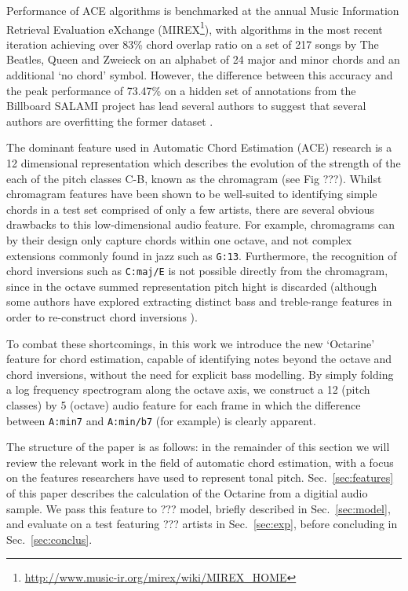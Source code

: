 \documentclass{article}
\begin{document}
Performance of ACE algorithms is benchmarked at the annual Music Information Retrieval Evaluation eXchange (MIREX\footnote{\url{http://www.music-ir.org/mirex/wiki/MIREX_HOME}}), with algorithms in the most recent iteration achieving over 83\% chord overlap ratio on a set of 217 songs by The Beatles, Queen and Zweieck on an alphabet of 24 major and minor chords and an additional `no chord' symbol. However, the difference between this accuracy and the peak performance of 73.47\% on a hidden set of annotations from the Billboard SALAMI project \cite{burgoyne2011expert} has lead several authors to suggest that several authors are overfitting the former dataset \cite{de2012improving,6155600}. 

The dominant feature used in Automatic Chord Estimation (ACE) research is a 12 dimensional representation which describes the evolution of the strength of the each of the pitch classes C-B, known as the chromagram (see Fig ???). Whilst chromagram features have been shown to be well-suited to identifying simple chords in a test set comprised of only a few artists, there are several obvious drawbacks to this low-dimensional audio feature. For example, chromagrams can by their design only capture chords within one octave, and not complex extensions commonly found in jazz such as \texttt{G:13}. Furthermore, the recognition of chord inversions such as \texttt{C:maj/E} is not possible directly from the chromagram, since in the octave summed representation pitch hight is discarded (although some authors have explored extracting distinct bass and treble-range features in order to re-construct chord inversions \cite{6155600,mauch2010simultaneous}). 

To combat these shortcomings, in this work we introduce the new `Octarine' feature for chord estimation, capable of identifying notes beyond the octave and chord inversions, without the need for explicit bass modelling. By simply folding a log frequency spectrogram along the octave axis, we construct a 12 (pitch classes) by 5 (octave) audio feature for each frame in which the difference between \texttt{A:min7} and \texttt{A:min/b7} (for example) is clearly apparent. 

The structure of the paper is as follows: in the remainder of this section we will review the relevant work in the field of automatic chord estimation, with a focus on the features researchers have used to represent tonal pitch. Sec.~\ref{sec:features} of this paper describes the calculation of the Octarine from a digitial audio sample. We pass this feature to ??? model, briefly described in Sec.~\ref{sec:model}, and evaluate on a test featuring ??? artists in Sec.~\ref{sec:exp}, before concluding in Sec.~\ref{sec:conclus}.
\end{document}
